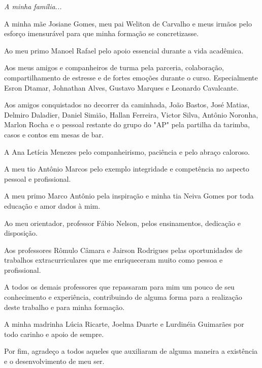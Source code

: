 \newpage
\vspace*{\fill}
\begin{flushright}
		\textit{A minha família...}
\end{flushright}

\begin{agradecimentos}
	
	A minha mãe Josiane Gomes, meu pai Weliton de Carvalho e meus irmãos pelo esforço imensurável para que minha formação se concretizasse.
	
	Ao meu primo Manoel Rafael pelo apoio essencial durante a vida acadêmica.
	
	Aos meus amigos e companheiros de turma pela parceria, colaboração, compartilhamento de estresse e de fortes emoções durante o curso. Especialmente Esron Dtamar, Johnathan Alves, Gustavo Marques e Leonardo Cavalcante.
	
	Aos amigos conquistados no decorrer da caminhada, João Bastos, José Matias, Delmiro Daladier, Daniel Simião, Hallan Ferreira, Victor Silva, Antônio Noronha, Marlon Rocha e o pessoal restante do grupo do "AP" pela partilha da tarimba, casos e contos em mesas de bar.
	
	A Ana Letícia Menezes pelo companheirismo, paciência e pelo abraço caloroso.
	
	A meu tio Antônio Marcos pelo exemplo integridade e competência no aspecto pessoal e profissional.
	
	A meu primo Marco Antônio pela inspiração e minha tia Neiva Gomes por toda educação e amor dados à mim.
	
	Ao meu orientador, professor Fábio Nelson, pelos ensinamentos, dedicação e disposição.
	
	Aos professores Rômulo Câmara e Jairson Rodrigues pelas oportunidades de trabalhos extracurriculares que me enriqueceram muito como pessoa e profissional.
	
	A todos os demais professores que repassaram para mim um pouco de seu conhecimento e experiência, contribuindo de alguma forma para a realização deste trabalho e para minha formação.
	
	A minha madrinha Lúcia Ricarte, Joelma Duarte e Lurdinéia Guimarães por todo carinho e apoio de sempre.

	Por fim, agradeço a todos aqueles que auxiliaram de alguma maneira a existência e o desenvolvimento de meu ser.

\end{agradecimentos}

